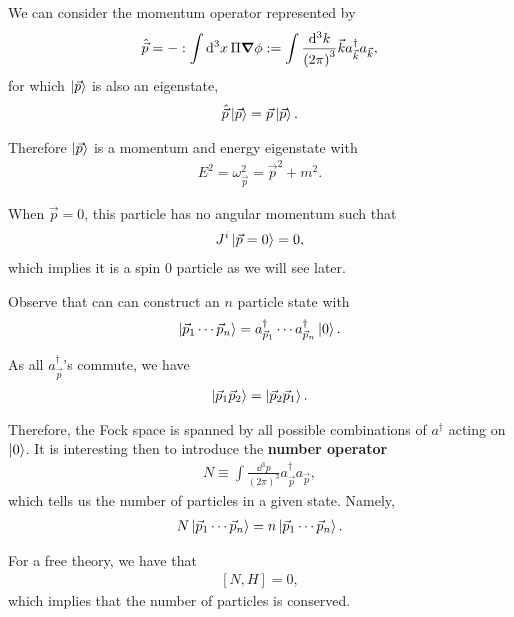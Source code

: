 
We can consider the momentum operator represented by
\begin{align}
    \hat{\vec{p}} = - : \int \dd{^3x} \Pi \grad \phi : = \int \frac{\dd{^3k}}{\left( 2\pi \right)^3} \vec{k} a_{\vec{k}}^{\dag} a_{\vec{k}}
,\end{align}
for which $\ket{\vec{p}}$ is also an eigenstate,
\begin{align}
    \hat{\vec{p}} \ket{\vec{p}} = \vec{p} \ket{\vec{p}}
.\end{align}

Therefore $\ket{\vec{p}}$ is a momentum and energy eigenstate with
\begin{align}
    E^2 = \omega_{\vec{p}}^2 = \vec{p}^2 + m^2
.\end{align}

\begin{note}
    When $\vec{p} = 0$, this particle has no angular momentum such that
    \begin{align}
        J^{i} \ket{\vec{p} = 0} = 0
    ,\end{align}
    which implies it is a spin 0 particle as we will see later.
\end{note}

Observe that can can construct an $n$ particle state with
\begin{align}
    \ket{\vec{p}_1 \cdots \vec{p}_{n}} = a^{\dag}_{\vec{p}_1} \cdots a^{\dag}_{\vec{p}_n} \ket{0}
.\end{align}

As all $a^{\dag}_{\vec{p}}$'s commute, we have
\begin{align}
    \ket{\vec{p}_1 \vec{p}_2} = \ket{\vec{p}_2 \vec{p}_1}
.\end{align}

Therefore, the Fock space is spanned by all possible combinations of $a^{\dag}$ acting on $\ket{0}$. It is interesting then to introduce the \textbf{number operator}
\begin{align}
    N \equiv \int \frac{\dd{^3p}}{\left( 2\pi \right)^3} a^{\dag}_{\vec{p}} a_{\vec{p}}
,\end{align}
which tells us the number of particles in a given state. Namely,
\begin{align}
    N \ket{\vec{p}_1 \cdots \vec{p}_{n}} = n \ket{\vec{p}_1 \cdots \vec{p}_{n}}
.\end{align}

For a free theory, we have that
\begin{align}
    \left[ N, H \right] = 0
,\end{align}
which implies that the number of particles is conserved. 

